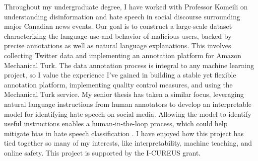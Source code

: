 
Throughout my undergraduate degree, I have worked with Professor Komeili on understanding disinformation and hate speech in social discourse surrounding major Canadian news events. Our goal is to construct a large-scale dataset characterizing the language use and behavior of malicious users, backed by precise annotations as well as natural language explanations. This involves collecting Twitter data and implementing an annotation platform for Amazon Mechanical Turk. The data annotation process is integral to any machine learning project, so I value the experience I've gained in building a stable yet flexible annotation platform, implementing quality control measures, and using the Mechanical Turk service. My senior thesis has taken a similar focus, leveraging natural language instructions from human annotators to develop an interpretable model for identifying hate speech on social media. Allowing the model to identify useful instructions enables a human-in-the-loop process, which could help mitigate bias in hate speech classification \cite{sap-etal-2019-risk}. I have enjoyed how this project has tied together so many of my interests, like interpretability, machine teaching, and online safety. This project is supported by the I-CUREUS grant.